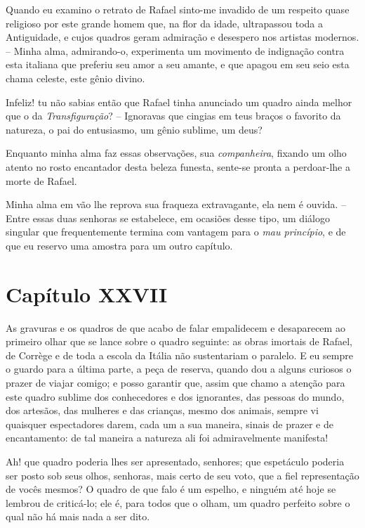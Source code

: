  Quando eu examino o retrato de Rafael sinto-me invadido de um respeito
quase religioso por este grande homem que, na flor da idade,
ultrapassou toda a Antiguidade, e cujos quadros geram admiração e
desespero nos artistas modernos. -- Minha alma, admirando-o,
experimenta um movimento de indignação contra esta italiana que
preferiu seu amor a seu amante, e que apagou em seu seio esta chama
celeste, este gênio divino.

 Infeliz! tu não sabias então que Rafael tinha anunciado um quadro ainda
melhor que o da \textit{Transfiguração}? -- Ignoravas que cingias em
teus braços o favorito da natureza, o pai do entusiasmo, um gênio
sublime, um deus?

 Enquanto minha alma faz essas observações, sua \textit{companheira},
fixando um olho atento no rosto encantador desta beleza funesta,
sente-se pronta a perdoar-lhe a morte de Rafael.

 Minha alma em vão lhe reprova sua fraqueza extravagante, ela nem é
ouvida. -- Entre essas duas senhoras se estabelece, em ocasiões desse
tipo, um diálogo singular que frequentemente termina com vantagem para
o \textit{mau princípio}, e de que eu reservo uma amostra para um outro
capítulo.

\section{Capítulo XXVII}

 As gravuras e os quadros de que acabo de falar empalidecem e
desaparecem ao primeiro olhar que se lance sobre o quadro seguinte: as
obras imortais de Rafael, de Corrège e de toda a escola da Itália não
sustentariam o paralelo. E eu sempre o guardo para a última parte, a
peça de reserva, quando dou a alguns curiosos o prazer de viajar
comigo; e posso garantir que, assim que chamo a atenção para este
quadro sublime dos conhecedores e dos ignorantes, das pessoas do mundo,
dos artesãos, das mulheres e das crianças, mesmo dos animais, sempre vi
quaisquer espectadores darem, cada um a sua maneira, sinais de prazer e
de encantamento: de tal maneira a natureza ali foi admiravelmente
manifesta!

 Ah! que quadro poderia lhes ser apresentado, senhores; que espetáculo
poderia ser posto sob seus olhos, senhoras, mais certo de seu voto, que
a fiel representação de vocês mesmos? O quadro de que falo é um
espelho, e ninguém até hoje se lembrou de criticá-lo; ele é, para todos
que o olham, um quadro perfeito sobre o qual não há mais nada a ser
dito.

